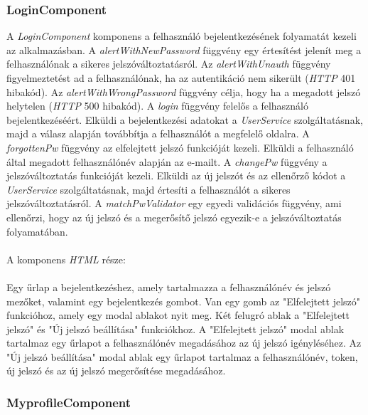 \subsubsection{LoginComponent}

A \textit{LoginComponent} komponens a felhasználó bejelentkezésének folyamatát kezeli az  alkalmazásban. A \textit{alertWithNewPassword} függvény egy értesítést jelenít meg a felhasználónak a sikeres jelszóváltoztatásról. Az \textit{alertWithUnauth} függvény figyelmeztetést ad a felhasználónak, ha az autentikáció nem sikerült (\textit{HTTP} 401 hibakód). Az \textit{alertWithWrongPassword} függvény célja, hogy ha a megadott jelszó helytelen (\textit{HTTP} 500 hibakód). A \textit{login} függvény felelős a felhasználó bejelentkezéséért. Elküldi a bejelentkezési adatokat a \textit{UserService} szolgáltatásnak, majd a válasz alapján továbbítja a felhasználót a megfelelő oldalra. A \textit{forgottenPw} függvény az elfelejtett jelszó funkcióját kezeli. Elküldi a felhasználó által megadott felhasználónév alapján az e-mailt. A \textit{changePw} függvény a jelszóváltoztatás funkcióját kezeli. Elküldi az új jelszót és az ellenőrző kódot a \textit{UserService} szolgáltatásnak, majd értesíti a felhasználót a sikeres jelszóváltoztatásról. A \textit{matchPwValidator} egy egyedi validációs függvény, ami ellenőrzi, hogy az új jelszó és a megerősítő jelszó egyezik-e a jelszóváltoztatás folyamatában.\\
\\
A komponens \textit{HTML} része:\\
\\
Egy űrlap a bejelentkezéshez, amely tartalmazza a felhasználónév és jelszó mezőket, valamint egy bejelentkezés gombot. Van egy gomb az "Elfelejtett jelszó" funkcióhoz, amely egy modal ablakot nyit meg. Két felugró ablak a "Elfelejtett jelszó" és "Új jelszó beállítása" funkciókhoz. A "Elfelejtett jelszó" modal ablak tartalmaz egy űrlapot a felhasználónév megadásához az új jelszó igényléséhez. Az "Új jelszó beállítása" modal ablak egy űrlapot tartalmaz a felhasználónév, token, új jelszó és az új jelszó megerősítése megadásához.


\subsubsection{MyprofileComponent}

